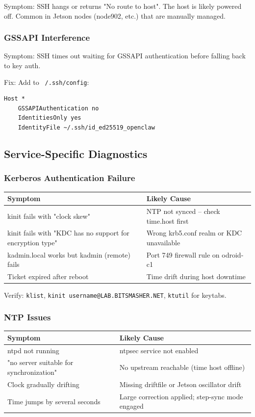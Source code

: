 Symptom: SSH hangs or returns "No route to host". The host is likely powered off. Common in Jetson nodes (node902, etc.) that are manually managed.

\subsubsection{GSSAPI Interference}

Symptom: SSH times out waiting for GSSAPI authentication before falling back to key auth.

Fix: Add to \texttt{~/.ssh/config}:
\begin{lstlisting}[style=mystyle]
Host *
    GSSAPIAuthentication no
    IdentitiesOnly yes
    IdentityFile ~/.ssh/id_ed25519_openclaw
    \end{lstlisting}

\subsection{Service-Specific Diagnostics}

\subsubsection{Kerberos Authentication Failure}

\begin{tabularx}{\textwidth}{l X}
\textbf{Symptom} & \textbf{Likely Cause} \\
\hline
kinit fails with "clock skew" & NTP not synced -- check time.host first\\
kinit fails with "KDC has no support for encryption type" & Wrong krb5.conf realm or KDC unavailable\\
kadmin.local works but kadmin (remote) fails & Port 749 firewall rule on odroid-c1\\
Ticket expired after reboot & Time drift during host downtime
\end{tabularx}

Verify: \texttt{klist}, \texttt{kinit username@LAB.BITSMASHER.NET}, \texttt{ktutil} for keytabs.

\subsubsection{NTP Issues}

\begin{tabularx}{\textwidth}{l X}
\textbf{Symptom} & \textbf{Likely Cause} \\
\hline
ntpd not running & ntpsec service not enabled\\
"no server suitable for synchronization" & No upstream reachable (time host offline)\\
Clock gradually drifting & Missing driftfile or Jetson oscillator drift\\
Time jumps by several seconds & Large correction applied; step-sync mode engaged
\end{tabularx}

